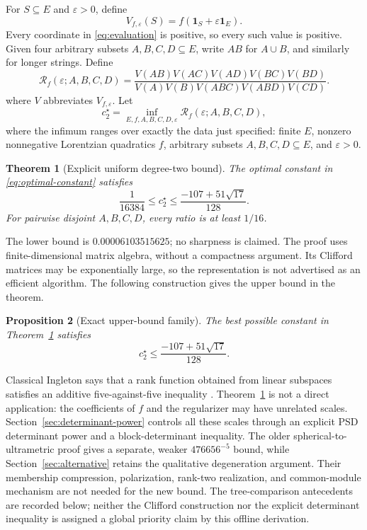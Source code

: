 \documentclass[11pt]{article}
\newtheorem{theorem}{Theorem}[section]
\newtheorem{proposition}[theorem]{Proposition}
\theoremstyle{remark}
\newcommand{\one}{\mathbf{1}}
\begin{document}
For $S\subseteq E$ and $\varepsilon>0$, define
\begin{equation}
 V_{f,\varepsilon}(S)=f(\one_S+\varepsilon\one_E).
 \label{eq:evaluation}
\end{equation}
Every coordinate in \eqref{eq:evaluation} is positive, so every such value is
positive.  Given four arbitrary subsets $A,B,C,D\subseteq E$, write $AB$ for
$A\cup B$, and similarly for longer strings.  Define
\begin{equation}
 \mathcal R_f(\varepsilon;A,B,C,D)=
 \frac{V(AB)V(AC)V(AD)V(BC)V(BD)}
 {V(A)V(B)V(ABC)V(ABD)V(CD)}.
 \label{eq:ratio}
\end{equation}
where $V$ abbreviates $V_{f,\varepsilon}$.  Let
\begin{equation}
 c_2^\star=
 \inf_{E,f,A,B,C,D,\varepsilon}
 \mathcal R_f(\varepsilon;A,B,C,D),
 \label{eq:optimal-constant}
\end{equation}
where the infimum ranges over exactly the data just specified: finite $E$,
nonzero nonnegative Lorentzian quadratics $f$, arbitrary subsets
$A,B,C,D\subseteq E$, and $\varepsilon>0$.

\begin{theorem}[Explicit uniform degree-two bound]
\label{thm:main}
The optimal constant in \eqref{eq:optimal-constant} satisfies
\[
 \frac1{16384}\leq c_2^\star
 \leq\frac{-107+51\sqrt{17}}{128}.
\]
For pairwise disjoint $A,B,C,D$, every ratio is at least $1/16$.
\end{theorem}

The lower bound is $0.00006103515625$; no sharpness is claimed.
The proof uses finite-dimensional matrix algebra, without a compactness
argument.  Its Clifford matrices may be exponentially large, so the
representation is not advertised as an efficient algorithm.
The following construction gives the upper bound in the theorem.

\begin{proposition}[Exact upper-bound family]
\label{prop:upper}
The best possible constant in Theorem~\ref{thm:main} satisfies
\[
 c_2^\star\leq \frac{-107+51\sqrt{17}}{128}.
\]
\end{proposition}

Classical Ingleton says that a rank function obtained from linear subspaces
satisfies an additive five-against-five inequality
\cite{Ingleton1971}.  Theorem~\ref{thm:main} is not a direct application:
the coefficients of $f$ and the regularizer may have unrelated scales.
Section~\ref{sec:determinant-power} controls all these scales through an
explicit PSD determinant power and a block-determinant inequality.
The older spherical-to-ultrametric proof gives a separate, weaker
$476656^{-5}$ bound, while Section~\ref{sec:alternative} retains the
qualitative degeneration argument.  Their membership compression,
polarization, rank-two realization, and common-module mechanism are not
needed for the new bound.  The tree-comparison antecedents are recorded
below; neither the Clifford construction nor the explicit determinant
inequality is assigned a global priority claim by this offline derivation.
\end{document}
